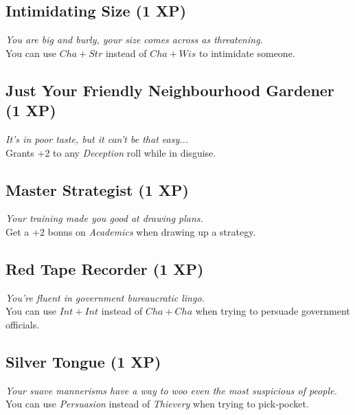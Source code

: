 \subsection*{Intimidating Size (1 XP)}
\textit{You are big and burly, your size comes across as threatening.}\\
You can use $Cha + Str$ instead of $Cha + Wis$ to intimidate someone.

\subsection*{Just Your Friendly Neighbourhood Gardener (1 XP)}
\textit{It's in poor taste, but it can't be that easy...}\\
Grants +2 to any \textit{Deception} roll while in disguise.

\subsection*{Master Strategist (1 XP)}
\textit{Your training made you good at drawing plans.}\\
Get a $+2$ bonus on \textit{Academics} when drawing up a strategy.

\subsection*{Red Tape Recorder (1 XP)}
\textit{You're fluent in government bureaucratic lingo.}\\ 
You can use $Int + Int$ instead of $Cha + Cha$ when trying to persuade government officials.

\subsection*{Silver Tongue (1 XP)}
\textit{Your suave mannerisms have a way to woo even the most suspicious of people.}\\
You can use \textit{Persuasion} instead of \textit{Thievery} when trying to pick-pocket.
